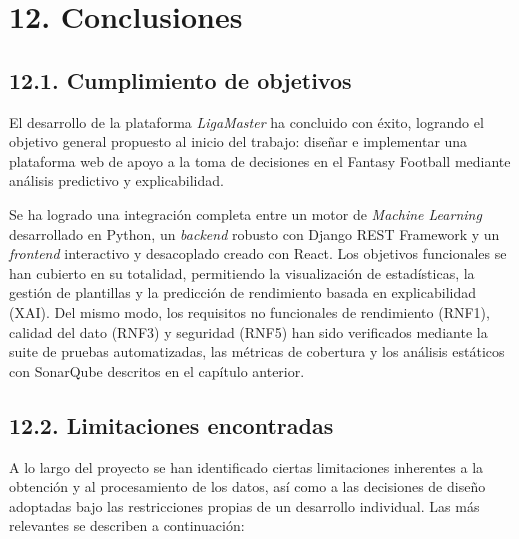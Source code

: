 
\section*{12. Conclusiones}
\label{sec:conclusiones}

\subsection{12.1. Cumplimiento de objetivos}
\label{subsec:cumplimiento_objetivos}

El desarrollo de la plataforma \textit{LigaMaster} ha concluido con
éxito, logrando el objetivo general propuesto al inicio del trabajo:
diseñar e implementar una plataforma web de apoyo a la toma de
decisiones en el Fantasy Football mediante análisis predictivo y
explicabilidad.

Se ha logrado una integración completa entre un motor de
\textit{Machine Learning} desarrollado en Python, un \textit{backend}
robusto con Django REST Framework y un \textit{frontend} interactivo y
desacoplado creado con React. Los objetivos funcionales se han cubierto
en su totalidad, permitiendo la visualización de estadísticas, la gestión
de plantillas y la predicción de rendimiento basada en explicabilidad
(XAI). Del mismo modo, los requisitos no funcionales de rendimiento
(RNF1), calidad del dato (RNF3) y seguridad (RNF5) han sido
verificados mediante la suite de pruebas automatizadas, las métricas de
cobertura y los análisis estáticos con SonarQube descritos en el
capítulo anterior.

\subsection{12.2. Limitaciones encontradas}
\label{subsec:limitaciones}

A lo largo del proyecto se han identificado ciertas limitaciones
inherentes a la obtención y al procesamiento de los datos, así como a
las decisiones de diseño adoptadas bajo las restricciones propias de un
desarrollo individual. Las más relevantes se describen a continuación:

